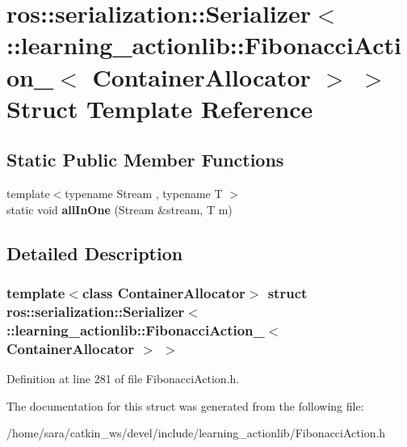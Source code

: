 \hypertarget{structros_1_1serialization_1_1Serializer_3_01_1_1learning__actionlib_1_1FibonacciAction___3_01ContainerAllocator_01_4_01_4}{}\section{ros\+:\+:serialization\+:\+:Serializer$<$ \+:\+:learning\+\_\+actionlib\+:\+:Fibonacci\+Action\+\_\+$<$ Container\+Allocator $>$ $>$ Struct Template Reference}
\label{structros_1_1serialization_1_1Serializer_3_01_1_1learning__actionlib_1_1FibonacciAction___3_01ContainerAllocator_01_4_01_4}
\subsection*{Static Public Member Functions}
\begin{DoxyCompactItemize}
\item 
\mbox{\label{structros_1_1serialization_1_1Serializer_3_01_1_1learning__actionlib_1_1FibonacciAction___3_01ContainerAllocator_01_4_01_4_a7562679d5ac21d53922af4d1e7f5b6a9}} 
{\footnotesize template$<$typename Stream , typename T $>$ }\\static void {\bfseries all\+In\+One} (Stream \&stream, T m)
\end{DoxyCompactItemize}


\subsection{Detailed Description}
\subsubsection*{template$<$class Container\+Allocator$>$\newline
struct ros\+::serialization\+::\+Serializer$<$ \+::learning\+\_\+actionlib\+::\+Fibonacci\+Action\+\_\+$<$ Container\+Allocator $>$ $>$}



Definition at line 281 of file Fibonacci\+Action.\+h.



The documentation for this struct was generated from the following file\+:\begin{DoxyCompactItemize}
\item 
/home/sara/catkin\+\_\+ws/devel/include/learning\+\_\+actionlib/Fibonacci\+Action.\+h\end{DoxyCompactItemize}
